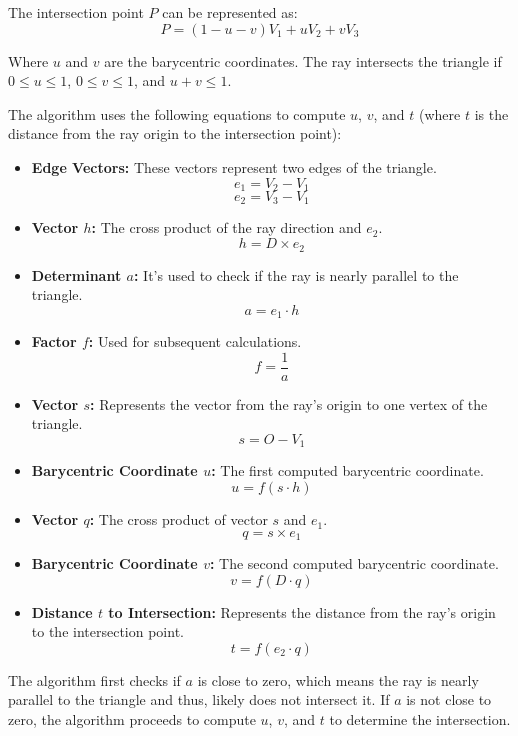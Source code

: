 \documentclass[11pt, a4paper,oneside,chapterprefix=false]{scrbook}
\begin{document}
The intersection point \( P \) can be represented as:
\[ P = (1 - u - v) V_1 + u V_2 + v V_3 \]

Where \( u \) and \( v \) are the barycentric coordinates. The ray intersects the triangle if \( 0 \leq u \leq 1 \), \( 0 \leq v \leq 1 \), and \( u + v \leq 1 \).

The algorithm uses the following equations to compute \( u \), \( v \), and \( t \) (where \( t \) is the distance from the ray origin to the intersection point):

\begin{itemize}
    \item \textbf{Edge Vectors:} These vectors represent two edges of the triangle.
	\[ e_1 = V_2 - V_1 \]
	\[ e_2 = V_3 - V_1 \]
	
    \item \textbf{Vector \( h \):} The cross product of the ray direction and \( e_2 \).
    \[ h = D \times e_2 \]
    
    \item \textbf{Determinant \( a \):} It's used to check if the ray is nearly parallel to the triangle.
    \[ a = e_1 \cdot h \]
    
    \item \textbf{Factor \( f \):} Used for subsequent calculations.
    \[ f = \frac{1}{a} \]
    
    \item \textbf{Vector \( s \):} Represents the vector from the ray's origin to one vertex of the triangle.
    \[ s = O - V_1 \]
    
    \item \textbf{Barycentric Coordinate \( u \):} The first computed barycentric coordinate.
    \[ u = f (s \cdot h) \]
    
    \item \textbf{Vector \( q \):} The cross product of vector \( s \) and \( e_1 \).
    \[ q = s \times e_1 \]
    
    \item \textbf{Barycentric Coordinate \( v \):} The second computed barycentric coordinate.
    \[ v = f (D \cdot q) \]
    
    \item \textbf{Distance \( t \) to Intersection:} Represents the distance from the ray's origin to the intersection point.
    \[ t = f (e_2 \cdot q) \]
\end{itemize}

The algorithm first checks if \( a \) is close to zero, which means the ray is nearly parallel to the triangle and thus, likely does not intersect it. If \( a \) is not close to zero, the algorithm proceeds to compute \( u \), \( v \), and \( t \) to determine the intersection.
\end{document}
